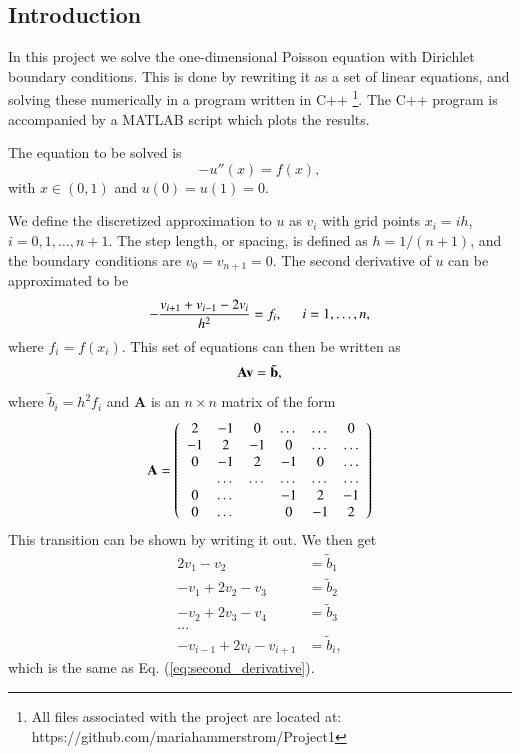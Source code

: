 \documentclass{article}
\begin{document}
\begin{multicols}{2}

\section{Introduction}
In this project we solve the one-dimensional Poisson equation with Dirichlet boundary conditions. This is done by rewriting it as a set of linear equations, and solving these numerically in a program written in C++ \footnote{All files associated with the project are located at: https://github.com/mariahammerstrom/Project1}. The C++ program is accompanied by a MATLAB script which plots the results. 

The equation to be solved is
\begin{equation}\label{eq:Poisson}
	-u''(x) = f(x),
\end{equation}
with $x\in(0,1)$ and $u(0) = u(1) = 0$.

We define the discretized approximation to $u$ as $v_i$  with grid points $x_i=ih$, $i=0,1,\dots ,n+1$. The step length, or spacing, is defined as $h=1/(n+1)$, and the boundary conditions are $v_0 = v_{n+1} = 0$. The second derivative of $u$ can be approximated to be
\begin{equation}\label{eq:second_derivative}
   -\frac{v_{i+1}+v_{i-1}-2v_i}{h^2} = f_i,  \hspace{0.5cm} i=1,\dots, n,
\end{equation}
where $f_i=f(x_i)$. This set of equations can then be written as 
\begin{equation}
	{\bf A}{\bf v} = \tilde{{\bf b}},
\end{equation}
where $\tilde{b}_i=h^2f_i$ and \textbf{A} is an $n\times n$ matrix of the form
\begin{equation}
    {\bf A} = \left(\begin{array}{cccccc}
                           2& -1& 0 &\dots   & \dots &0 \\
                           -1 & 2 & -1 &0 &\dots &\dots \\
                           0&-1 &2 & -1 & 0 & \dots \\
                           & \dots   & \dots &\dots   &\dots & \dots \\
                           0&\dots   &  &-1 &2& -1 \\
                           0&\dots    &  & 0  &-1 & 2 \\
                      \end{array} \right)
\end{equation}
This transition can be shown by writing it out. We then get
\begin{align*}
	2v_1 - v_2 &= \tilde{b}_1 \\
	-v_1 + 2v_2 - v_3 &= \tilde{b}_2 \\
	-v_2 + 2v_3 - v_4 &= \tilde{b}_3 \\
	... \\
	-v_{i-1} + 2v_i - v_{i+1} &= \tilde{b}_i,
\end{align*}
which is the same as Eq. (\ref{eq:second_derivative}). 


\end{multicols}
\end{document}
